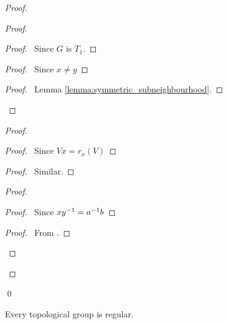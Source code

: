 \begin{proof}
    \pf
    \begin{proof}
        \begin{proof}
            \pf\ Since $G$ is $T_1$.
        \end{proof}
        \begin{proof}
            \pf\ Since $x \neq y$
        \end{proof}
        \qedstep
        \begin{proof}
            \pf\ Lemma \ref{lemma:symmetric_subneighbourhood}.
        \end{proof}
    \end{proof}
    \begin{proof}
        \begin{proof}
            \pf\ Since $Vx = r_x(V)$
        \end{proof}
        \begin{proof}
            \pf\ Similar.
        \end{proof}
        \begin{proof}
            \begin{proof}
                \pf\ Since $x {y}^{-1} = {a}^{-1} b$
            \end{proof}
            \qedstep
            \begin{proof}
                \pf\ From .
            \end{proof}
        \end{proof}
    \end{proof}
    \qed
\end{proof}

\begin{proposition}
    \label{proposition:regular_topological_group}
    Every topological group is regular.
\end{proposition}

